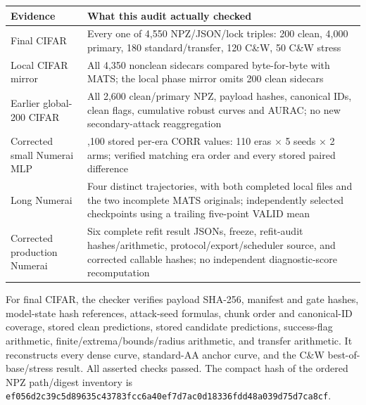 \documentclass[
  british,
  10pt,
  a4paper,
]{article}
\newcounter{none} %
\begin{document}
{\def\LTcaptype{none} %
\begin{longtable}[]{@{}
  >{\raggedright\arraybackslash}p{}
  >{\raggedright\arraybackslash}p{}@{}}
\toprule\noalign{}
\begin{minipage}[b]{\linewidth}\raggedright
Evidence
\end{minipage} & \begin{minipage}[b]{\linewidth}\raggedright
What this audit actually checked
\end{minipage} \\
\midrule\noalign{}
\endhead
\bottomrule\noalign{}
\endlastfoot
Final CIFAR & Every one of 4,550 NPZ/\allowbreak{}JSON/\allowbreak{}lock
triples: 200 clean, 4,000 primary, 180
standard/\allowbreak{}transfer,\allowbreak{} 120 C\&W, 50 C\&W stress \\
Local CIFAR mirror & All 4,350 nonclean sidecars compared
byte-\allowbreak{}for-\allowbreak{}byte with MATS; the local phase
mirror omits 200 clean sidecars \\
Earlier global-200 CIFAR & All 2,600 clean/\allowbreak{}primary NPZ,
payload hashes, canonical IDs, clean flags, cumulative robust curves and
AURAC; no new secondary-\allowbreak{}attack reaggregation \\
Corrected small Numerai MLP & 1,100 stored per-era CORR values: 110 eras
× 5 seeds × 2 arms; verified matching era order and every stored paired
difference \\
Long Numerai & Four distinct trajectories\allowbreak{},\allowbreak{}
with both completed local files and the two incomplete MATS originals;
independently selected checkpoints using a trailing five-point VALID
mean \\
Corrected production Numerai & Six complete refit result JSONs, freeze,
refit-\allowbreak{}audit hashes/\allowbreak{}arithmetic,\allowbreak{}
protocol/\allowbreak{}export/\allowbreak{}scheduler source, and
corrected callable hashes; no independent diagnostic-\allowbreak{}score
recomputation \\
\end{longtable}
}

For final CIFAR, the checker verifies payload SHA-256, manifest and gate
hashes, model-\allowbreak{}state hash references,\allowbreak{}
attack-\allowbreak{}seed formulas, chunk order and
canonical-\allowbreak{}ID coverage, stored clean
predictions,\allowbreak{} stored candidate predictions,\allowbreak{}
success-\allowbreak{}flag arithmetic,\allowbreak{}
finite/\allowbreak{}extrema/\allowbreak{}bounds/\allowbreak{}radius
arithmetic,\allowbreak{} and transfer arithmetic.\allowbreak{} It
reconstructs every dense curve, standard-\allowbreak{}AA anchor curve,
and the C\&W best-\allowbreak{}of-\allowbreak{}base/\allowbreak{}stress
result. All asserted checks passed. The compact hash of the ordered NPZ
path/\allowbreak{}digest inventory is
\texttt{ef056d2c39c5\allowbreak{}d89635c43783\allowbreak{}fcc6a40ef7d7\allowbreak{}ac0d18336fdd\allowbreak{}48a039d75d7c\allowbreak{}a8cf}.
\end{document}
